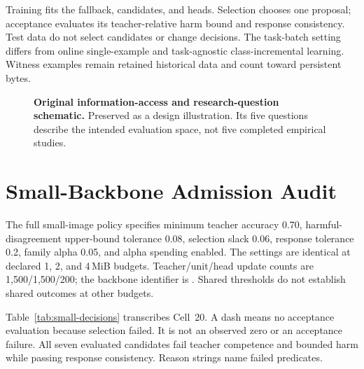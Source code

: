 \documentclass{article}
\begin{document}
Training fits the fallback, candidates, and heads. Selection chooses one proposal; acceptance evaluates its teacher-relative harm bound and response consistency. Test data do not select candidates or change decisions. The task-batch setting differs from online single-example and task-agnostic class-incremental learning. Witness examples remain retained historical data and count toward persistent bytes.

\begin{figure}[t]
\centering{}
\caption{\textbf{Original information-access and research-question schematic.} Preserved as a design illustration. Its five questions describe the intended evaluation space, not five completed empirical studies.}
\label{fig:firewall}
\end{figure}

\section{Small-Backbone Admission Audit}
The full small-image policy specifies minimum teacher accuracy 0.70, harmful-disagreement upper-bound tolerance 0.08, selection slack 0.06, response tolerance 0.2, family alpha 0.05, and alpha spending enabled. The settings are identical at declared 1, 2, and 4\,MiB budgets. Teacher/unit/head update counts are 1,500/1,500/200; the backbone identifier is . Shared thresholds do not establish shared outcomes at other budgets.

Table~\ref{tab:small-decisions} transcribes Cell~20. A dash means no acceptance evaluation because selection failed. It is not an observed zero or an acceptance failure. All seven evaluated candidates fail teacher competence and bounded harm while passing response consistency. Reason strings name failed predicates.
\end{document}
